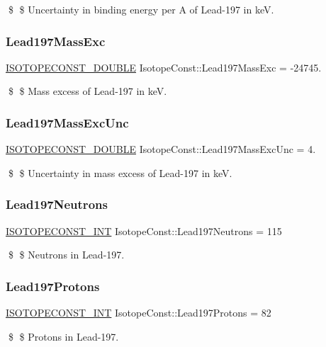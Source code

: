 \$ \$ Uncertainty in binding energy per A of Lead-\/197 in keV. \mbox{\label{group___isotope_const-_lead-_pb197_ga305167d6dd6f67bff1d6e3237f5fd1a4}} 
\subsubsection{\texorpdfstring{Lead197\+Mass\+Exc}{Lead197MassExc}}
{\footnotesize\ttfamily \mbox{\hyperlink{group___isotope_const-_macros_ga8f45a7272ce02c0b4c65c44636ed719a}{I\+S\+O\+T\+O\+P\+E\+C\+O\+N\+S\+T\+\_\+\+D\+O\+U\+B\+LE}} Isotope\+Const\+::\+Lead197\+Mass\+Exc = -\/24745.}

\$ \$ Mass excess of Lead-\/197 in keV. \mbox{\label{group___isotope_const-_lead-_pb197_gad9232262e59f71d17f8461365d84ae1e}} 
\subsubsection{\texorpdfstring{Lead197\+Mass\+Exc\+Unc}{Lead197MassExcUnc}}
{\footnotesize\ttfamily \mbox{\hyperlink{group___isotope_const-_macros_ga8f45a7272ce02c0b4c65c44636ed719a}{I\+S\+O\+T\+O\+P\+E\+C\+O\+N\+S\+T\+\_\+\+D\+O\+U\+B\+LE}} Isotope\+Const\+::\+Lead197\+Mass\+Exc\+Unc = 4.}

\$ \$ Uncertainty in mass excess of Lead-\/197 in keV. \mbox{\label{group___isotope_const-_lead-_pb197_gad58e46e0e724b3fb37b3be4a7c69eab0}} 
\subsubsection{\texorpdfstring{Lead197\+Neutrons}{Lead197Neutrons}}
{\footnotesize\ttfamily \mbox{\hyperlink{group___isotope_const-_macros_ga5f18360b3e99483a35c32d789e62621c}{I\+S\+O\+T\+O\+P\+E\+C\+O\+N\+S\+T\+\_\+\+I\+NT}} Isotope\+Const\+::\+Lead197\+Neutrons = 115}

\$ \$ Neutrons in Lead-\/197. \mbox{\label{group___isotope_const-_lead-_pb197_ga6eb045168cb57c47863fe640171b786c}} 
\subsubsection{\texorpdfstring{Lead197\+Protons}{Lead197Protons}}
{\footnotesize\ttfamily \mbox{\hyperlink{group___isotope_const-_macros_ga5f18360b3e99483a35c32d789e62621c}{I\+S\+O\+T\+O\+P\+E\+C\+O\+N\+S\+T\+\_\+\+I\+NT}} Isotope\+Const\+::\+Lead197\+Protons = 82}

\$ \$ Protons in Lead-\/197. 